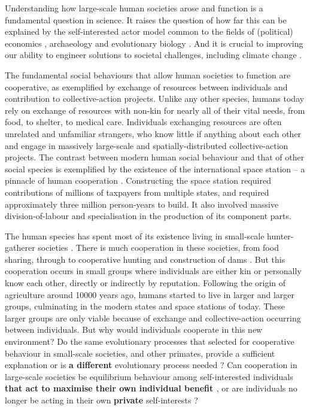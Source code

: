 \documentclass[10pt, a4paper, fleqn]{article}
\begin{document}
Understanding how large-scale human societies arose and function is a fundamental question in science. It raises the question of how far this can be explained by the self-interested actor model common to the fields of (political) economics \citep{MasCollelWG95,PindyckR01,Ober:2008:a,Fukuyama:2011:a}, archaeology \citep{Stanish:2017:a} and evolutionary biology \citep{Alexander:1990:a,Parker:1990:a,Davies:2012:a,Alcock:2013:a}. And it is crucial to improving our ability to engineer solutions to societal challenges, including climate change \citep{Milinski:2008:a,Tavoni:2011:a}.

The fundamental social behaviours that allow human societies to function are cooperative, as exemplified by exchange of resources between individuals and contribution to collective-action projects. Unlike any other species, humans today rely on exchange of resources with non-kin for nearly all of their vital needs, from food, to shelter, to medical care. Individuals exchanging resources are often unrelated and unfamiliar strangers, who know little if anything about each other and engage in massively large-scale and spatially-distributed collective-action projects. The contrast between modern human social behaviour and that of other social species is exemplified by the existence of the international space station -- a pinnacle of human cooperation \citep{Turchin:2015:b}. Constructing the space station required contributions of millions of taxpayers from multiple states, and required approximately three million person-years to build. It also involved massive division-of-labour and specialisation in the production of its component parts. 

The human species has spent most of its existence living in small-scale hunter-gatherer societies \citep{Boehm:1999:a,Marlowe:2005:a,Kelly:2013:a}. There is much cooperation in these societies, from food sharing, through to cooperative hunting and construction of dams \citep{Kaplan:2009:a,Jaeggi:2013:a,Hooper:2015:a}. But this cooperation occurs in small groups where individuals are either kin or personally know each other, directly or indirectly by reputation. Following the origin of agriculture around 10000 years ago, humans started to live in larger and larger groups, culminating in the modern states and space stations of today. These larger groups are only viable because of exchange and collective-action occurring between individuals. But why would individuals cooperate in this new environment? Do the same evolutionary processes that selected for cooperative behaviour in small-scale societies, and other primates, provide a sufficient explanation \citep{Alexander:1987:a,Cosmides:1992:a,West:2011:a,Tooby:2016:a} or is \textbf{a different} evolutionary process needed \citep{Richerson:2005:a,Turchin:2015:b,Henrich:2016:b}? Can cooperation in large-scale societies be equilibrium behaviour among self-interested individuals \textbf{that act to  maximise their own individual benefit \citep{North:1990:a,Greif:2006:a,Powers:2016:a}}, or are individuals no longer be acting in their own \textbf{private} self-interests \citep{Richerson:2005:a,Bowles:2011:b,Turchin:2015:b,Henrich:2016:b}?
\end{document}
